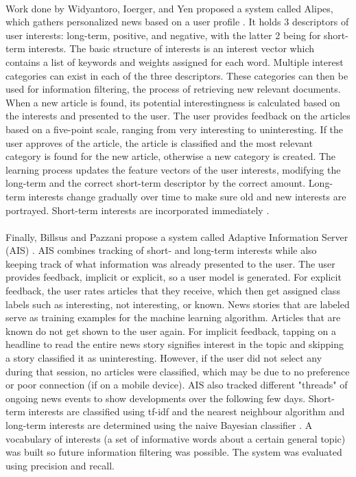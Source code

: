 \documentclass[11pt,titlepage]{report}
\begin{document}
\paragraph{}
Work done by Widyantoro, Ioerger, and Yen proposed a system called Alipes, which gathers personalized news based on a user profile \cite{alipes}. It holds 3 descriptors of user interests: long-term, positive, and negative, with the latter 2 being for short-term interests. The basic structure of interests is an interest vector which contains a list of keywords and weights assigned  for each word. Multiple interest categories can exist in each of the three descriptors. These categories can then be used for information filtering, the process of retrieving new relevant documents. When a new article is found, its potential interestingness is calculated based on the interests and presented to the user. The user provides feedback on the articles based on a five-point scale, ranging from very interesting to uninteresting. If the user approves of the article, the article is classified and the most relevant category is found for the new article, otherwise a new category is created. The learning process updates the feature vectors of the user interests, modifying the long-term and the correct short-term descriptor by the correct amount. Long-term interests change gradually over time to make sure old and new interests are portrayed. Short-term interests are incorporated immediately \cite{alipes}. 
\paragraph{}
Finally, Billsus and Pazzani propose a system called Adaptive Information Server (AIS) \cite{billsus}. AIS combines tracking of short- and long-term interests while also keeping track of what information was already presented to the user. The user provides feedback, implicit or explicit, so a user model is generated. For explicit feedback, the user rates articles that they receive, which then get assigned class labels such as interesting, not interesting, or known. News stories that are labeled serve as training examples for the machine learning algorithm. Articles that are known do not get shown to the user again. For implicit feedback, tapping on a headline to read the entire news story signifies interest in the topic and skipping a story classified it as uninteresting. However, if the user did not select any during that session, no articles were classified, which may be due to no preference or poor connection (if on a mobile device). AIS also tracked different "threads" of ongoing news events to show developments over the following few days. Short-term interests are classified using tf-idf and the nearest neighbour algorithm and long-term interests are determined using the naive Bayesian classifier \cite{billsus}. A vocabulary of interests (a set of informative words about a certain general topic) was built so future information filtering was possible. The system was evaluated using precision and recall. 
\end{document}
